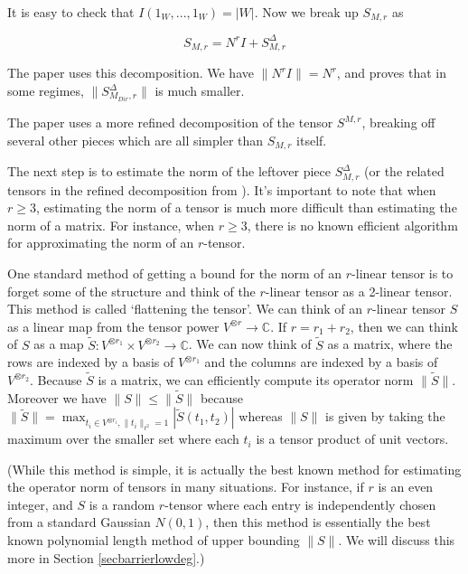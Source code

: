 \documentclass{amsart}
\newcommand{\CC}{\mathbb{C}}
\begin{document}
\noindent It is easy to check that $I(1_W, ..., 1_W) = |W|$.  Now we break up $S_{M, r}$ as

\begin{equation} S_{M,r} = N^r I + S^\Delta_{M, r}
\end{equation}

The paper \cite{GM} uses this decomposition.  We have $\| N^r I \| = N^r$, and \cite{GM} proves that in some regimes, $\| S^\Delta_{M_{Dir}, r}\|$ is much smaller.  

The paper \cite{DHPT} uses a more refined decomposition of the tensor $S^{M, r}$, breaking off several other pieces which are all simpler than $S_{M,r}$ itself.

The next step is to estimate the norm of the leftover piece $S^\Delta_{M,r}$ (or the related tensors in the refined decomposition from \cite{DHPT}).   It's important to note that when $r \ge 3$, estimating the norm of a tensor is much more difficult than estimating the norm of a matrix.  For instance, when $r \ge 3$, there is no known efficient algorithm for approximating the norm of an $r$-tensor.

One standard method of getting a bound for the norm of an $r$-linear tensor is to forget some of the structure and think of the $r$-linear tensor as a 2-linear tensor.  This method is called `flattening the tensor'.  We can think of an $r$-linear tensor $S$ as a linear map from the tensor power $V^{\otimes r} \rightarrow \CC$.  If $r = r_1 + r_2$, then we can think of $S$ as a map $\tilde S: V^{\otimes r_1} \times V^{\otimes r_2} \rightarrow \CC$.   We can now think of $\tilde S$ as a matrix, where the rows are indexed by a basis of $V^{\otimes r_1}$ and the columns are indexed by a basis of $V^{\otimes r_2}$.   Because $\tilde S$ is a matrix,  we can efficiently compute its operator norm $\| \tilde S \|$.   Moreover we have $\| S \| \le \| \tilde S \|$ because $\| \tilde S \| = \max_{t_i \in V^{\otimes r_i}, \| t_i \|_{\ell^2} = 1}|  \tilde S(t_1, t_2)|$ whereas $\| S \|$ is given by taking the maximum over the smaller set where each $t_i$ is a tensor product of unit vectors.  

(While this method is simple, it is actually the best known method for estimating the operator norm of tensors in many situations.  For instance, if $r$ is an even integer, and $S$ is a random $r$-tensor where each entry is independently chosen from a standard Gaussian $N(0,1)$, then this method is essentially the best known polynomial length method of upper bounding $\| S \|$.  We will discuss this more in Section \ref{secbarrierlowdeg}.)
\end{document}
